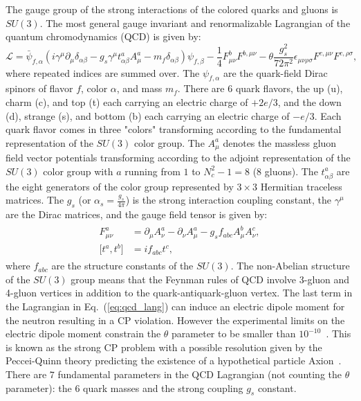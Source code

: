 The gauge group of the strong interactions of the colored quarks and gluons is $SU(3)$. The most general gauge invariant and renormalizable Lagrangian of the quantum chromodynamics (QCD) is given by:
 \begin{equation} \label{eq:qcd_lang}
\mathcal{L} =  \bar{\psi}_{f,\alpha} (i \gamma^{\mu}\partial_{\mu}\delta_{\alpha\beta}-g_{s}\gamma^{\mu}t^{a}_{\alpha\beta}A^{a}_{\mu}-m_{f}\delta_{\alpha\beta})\psi_{f,\beta}-\frac{1}{4}F_{\mu\nu}^{b}F^{b,\mu\nu}-\theta\frac{g_{s}^2}{72\pi^2}\epsilon_{\mu\nu\rho\sigma}F^{c,\mu\nu}F^{c,\rho\sigma},
\end{equation}
where repeated indices are summed over. The $\psi_{f,\alpha}$ are the quark-field Dirac spinors of flavor $f$, color $\alpha$, and mass $m_{f}$. There are $6$ quark flavors, the up (u), charm (c), and top (t) each carrying an electric charge of $+2e/3$, and the down (d), strange (s), and bottom (b) each carrying an electric charge of $-e/3$. Each quark flavor comes in three "colors" transforming according to the fundamental representation of the $SU(3)$ color group. The $A_{\mu}^{a}$ denotes the massless gluon field vector potentials transforming according to the adjoint representation of the $SU(3)$ color group with $a$ running from $1$ to $N_{c}^2-1=8$ (8 gluons).  The $t_{\alpha\beta}^{a}$ are the eight generators of the color group represented by $3 \times 3$ Hermitian traceless matrices. The $g_{s}$ (or $\alpha_{s} = \frac{g_{s}}{4\pi}$) is the strong interaction coupling constant, the $\gamma^{\mu}$ are the Dirac matrices, and the gauge field tensor is given by:
 \begin{eqnarray} \label{eq:qcd_field}
 \begin{aligned}
F_{\mu\nu}^{a} &= \partial_{\mu}A_{\nu}^a-\partial_{\nu}A_{\mu}^a-g_{s}f_{abc}A_{\mu}^{b}A_{\nu}^{c},  \\
\mathrm{[}t^a,t^b\mathrm{]} &= if_{abc}t^{c},
\end{aligned}
\end{eqnarray}
where $f_{abc}$ are the structure constants of the $SU(3)$. The non-Abelian structure of the $SU(3)$ group means that the Feynman rules of QCD involve 3-gluon and 4-gluon vertices in addition to the quark-antiquark-gluon vertex. The last term in the Lagrangian in Eq.~(\ref{eq:qcd_lang}) can induce an electric dipole moment for the neutron resulting in a CP violation. However the experimental limits on the electric dipole moment constrain the $\theta$ parameter to be smaller than $10^{-10}$~\cite{Agashe:2014kda}. This is known as the strong CP problem with a possible resolution given by the Peccei-Quinn theory predicting the existence of a hypothetical particle Axion~\cite{PhysRevLett.38.1440}. There are $7$ fundamental parameters in the QCD Lagrangian (not counting the $\theta$ parameter): the $6$ quark masses and the strong coupling $g_{s}$ constant.
